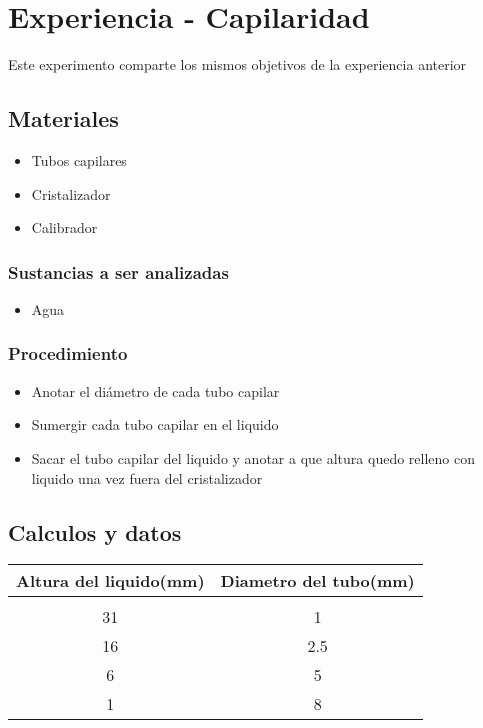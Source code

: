 \documentclass[11pt, letterpaper]{article}
\begin{document}
\section{Experiencia - Capilaridad}
Este experimento comparte los mismos objetivos de la experiencia anterior
\subsection{Materiales}
\begin{itemize}
	\item Tubos capilares
	\item Cristalizador
	\item Calibrador
\end{itemize}
\subsubsection{Sustancias a ser analizadas}
\begin{itemize}
	\item Agua
\end{itemize}
\subsubsection{Procedimiento}
\begin{itemize}
	\item Anotar el diámetro de cada tubo capilar
	\item Sumergir cada tubo capilar en el liquido 
	\item Sacar el tubo capilar del liquido y anotar a que altura quedo relleno con liquido una vez fuera del cristalizador
\end{itemize}
\subsection{Calculos y datos}
  \begin{center}
    \begin{tabular}{|c|c|}
    \toprule
    \rowcolor[rgb]{ .776,  .878,  .706} Altura del liquido(mm) & Diametro del tubo(mm) \\
    \midrule
    \rowcolor[rgb]{ 1,  1,  0} \multicolumn{2}{|c|}{Agua} \\
    \midrule
    31    & 1 \\
    \midrule
    16    & 2.5 \\
    \midrule
    6     & 5 \\
    \midrule
    1     & 8 \\
    \bottomrule
    \end{tabular}%
  \end{center}
\end{document}
